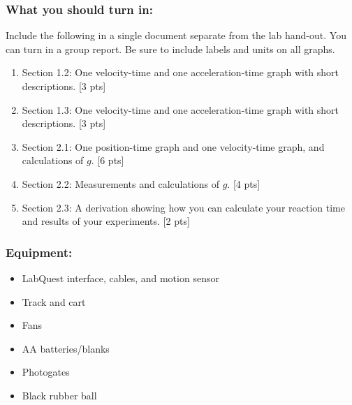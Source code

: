 \documentclass[11pt,letterpaper]{article}
\newcounter{question}[section]
\begin{document}
\subsubsection*{What you should turn in:}
Include the following in a single document separate from the lab hand-out. You can turn in a group report. Be sure to include labels and units on all graphs. 
\begin{enumerate}
\setlength{\parskip}{3pt}
\item Section 1.2: One velocity-time and one acceleration-time graph with short descriptions. [3 pts]
\item Section 1.3: One velocity-time and one acceleration-time graph with short descriptions. [3 pts]
\item Section 2.1: One position-time graph and one velocity-time graph, and calculations of $g$. [6 pts]
\item Section 2.2: Measurements and calculations of $g$. [4 pts]
\item Section 2.3: A derivation showing how you can calculate your reaction time and results of your experiments. [2 pts]
\end{enumerate}

\subsubsection*{Equipment:}
\begin{itemize}
\setlength{\parskip}{3pt}
\item LabQuest interface, cables, and motion sensor
\item Track and cart
\item Fans
\item AA batteries/blanks
\item Photogates
\item Black rubber ball
\end{itemize}
\end{document}
